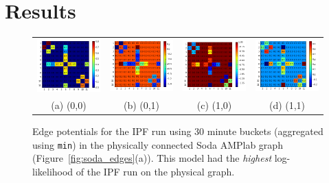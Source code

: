 \section{Results}

\begin{figure}
\centering
\begin{tabular}{cccc}
\includegraphics[width=1.3in]{figs/30minmin00conf} & \includegraphics[width=1.3in]{figs/30minmin01conf} & \includegraphics[width=1.3in]{figs/30minmin10conf} & \includegraphics[width=1.3in]{figs/30minmin11conf} \\
(a) (0,0) & (b) (0,1) & (c) (1,0) & (d) (1,1) \\[6pt]
\end{tabular}
\caption{Edge potentials for the IPF run using 30 minute buckets (aggregated using \texttt{min}) in the physically connected Soda AMPlab graph (Figure~\ref{fig:soda_edges}(a)). This model had the \emph{highest} log-likelihood of the IPF run on the physical graph.}
\label{fig:30minminphysical}
\end{figure}

